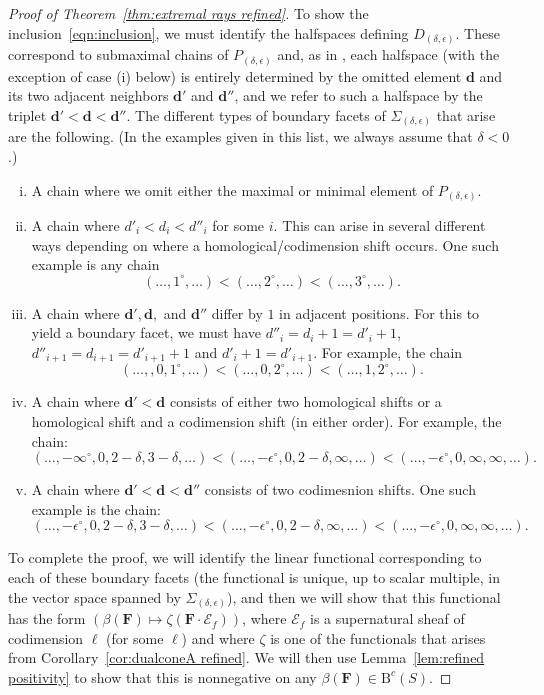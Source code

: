 \documentclass[12pt]{amsart}
\theoremstyle{definition}
\theoremstyle{remark}
\newcommand{\cc}{c}
\newcommand{\dd}{\mathbf{d}}
\newcommand{\cE}{\mathcal{E}}
\newcommand{\FF}{\mathbf{F}}
\newcommand{\zp}{\circ}
\newcommand{\BBQ}{\mathrm{B}}
\begin{document}
\begin{proof}[Proof of Theorem~\ref{thm:extremal rays refined}]
To show the inclusion~\eqref{eqn:inclusion}, we must identify the halfspaces defining $D_{(\delta,\epsilon)}$.  These correspond to submaximal chains of $P_{(\delta,\epsilon)}$ and, as in \cite[Proposition~2.12]{boij-sod1}, each halfspace (with the exception of case (i) below) is entirely determined by the omitted element $\dd$ and its two adjacent neighbors $\dd'$ and $\dd''$, and we refer to such a halfspace by the triplet $\dd'<\dd<\dd''$.  The different types of boundary facets of $\Sigma_{(\delta,\epsilon)}$ that arise are the following.  (In the examples given in this list, we always assume that $\delta<0$.)

\begin{enumerate}[(i)]

	\item A chain where we omit either the maximal or minimal element of $P_{(\delta,\epsilon)}$.

	\item A chain where $d'_i<d_i<d''_i$ for some $i$.  This can arise in several different ways depending on where a homological/codimension shift occurs.
	One such example is any chain
	\[
(\dots,1^\zp,\dots) <(\dots, 2^\zp,\dots) <(\dots,3^\zp,\dots).
	\]

	\item A chain where $\dd', \dd,$ and $\dd''$ differ by $1$ in adjacent positions.  For this to yield a boundary facet, we must have $d''_i=d_i+1=d'_i+1$, $d''_{i+1}=d_{i+1}=d'_{i+1}+1$ and $d'_i+1=d'_{i+1}$.  For example, the chain
			\[
(\dots,, 0,1^\zp,\dots) <(\dots, 0,2^\zp,\dots) <(\dots, 1,2^\zp,\dots) .
			\]
	\item A chain where $\dd'<\dd$ consists of either two homological shifts or a homological shift and a codimension shift (in either order).  
For example, the chain:
		\[
		(\dots, -\infty^\zp,0,2-\delta,3-\delta,\dots)<(\dots, -\epsilon^\zp,0,2-\delta,\infty,\dots)<(\dots, -\epsilon^\zp,0,\infty,\infty,\dots).
		\]

	\item A chain where $\dd'<\dd<\dd''$ consists of two codimesnion shifts.
One such example is the chain:
\[
(\dots, -\epsilon^\zp,0,2-\delta,3-\delta,\dots)<(\dots, -\epsilon^\zp,0,2-\delta,\infty,\dots)<(\dots, -\epsilon^\zp,0,\infty,\infty,\dots).
\]

\end{enumerate} 

To complete the proof, we will identify the linear functional corresponding to each of these boundary facets (the functional is unique, up to scalar multiple, in the vector space spanned by $\Sigma_{(\delta,\epsilon)}$), and then we will show that this functional has the form $(\beta(\FF)\mapsto \zeta(\FF\cdot \cE_f))$, where $\cE_f$ is a supernatural sheaf of codimension $\ell$ (for some $\ell$) and where $\zeta$ is one of the functionals that arises from Corollary~\ref{cor:dualconeA refined}.   We will then use Lemma~\ref{lem:refined positivity} to show that this is nonnegative on any $\beta(\FF)\in \BBQ^{\cc}(S)$.



\end{proof}
\end{document}
